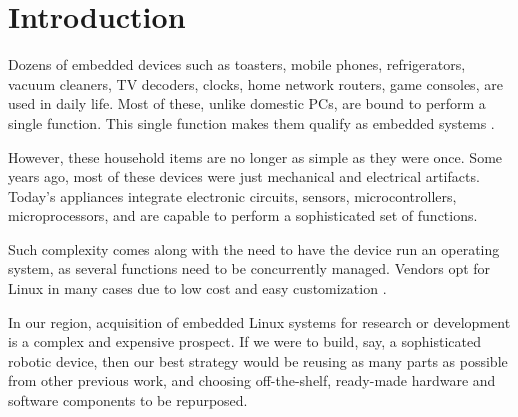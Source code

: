 \documentclass[conference]{IEEEtran}
\newcommand{\nota}[1]{}
\begin{document}
\section{Introduction}


\nota{
Existen decenas de dispositivos embebidos que utilizamos en la vida diaria.
Tostadoras, teléfonos móviles, heladeras, aspiradoras,
decodificadores de televisión, relojes, routers hogareños, consola de juegos, etc.
Y la mayoría de estos sistemas, a diferencia de una PC que puede
realizar miles de funciones diferentes, realizan una única función.
Esta única tarea define que nos encontramos ante sistemas embebidos \cite{steveheath}.
}
Dozens of embedded devices such as toasters, mobile phones, refrigerators, 
vacuum cleaners, TV decoders, clocks, home network routers, game consoles,  are used in daily life. Most of these, unlike domestic PCs, are bound to perform a single function. This single function makes them qualify as embedded systems \cite{steveheath}.


\nota{
Sin embargo, estos artículos del hogar ya no son tan simples como antes. Algunos
años atrás, la mayor parte de estos dispositivos fueron únicamente mecánicos
y eléctricos. En cambio, hoy en día, la mayoría incluye placas
de circuitos electrónicos, sensores, microcontroladores, microprocesadores y
funcionalidades sofisticadas.
}
However, these household items are no longer as simple as they were once. Some years ago,
most of these devices were just mechanical and electrical artifacts. Today's appliances
integrate electronic circuits, sensors, microcontrollers, microprocessors, 
and are capable to perform a sophisticated set of functions. 

\nota{
Esta complejidad trajo la necesidad de ejecutar un sistema operativo
dentro del dispositivo, ya
que se necesita administrar varias funcionalidades al mismo tiempo.
Actualmente, los fabricantes han optado por Linux en muchos
casos, debido principalmente a su
bajo costo y su gran adaptabilidad (referencia electrolux brasil, celular android, router linux)
}
Such complexity comes along with the need to have the device run an operating system, as several functions need to be concurrently managed. Vendors opt for Linux in many cases due to low cost and easy customization \cite{electrolux, android}.

\nota{En el marco regional, adquirir sistemas Linux embebidos para investigación
o desarrollo es complejo y costoso.
Si fuese necesario, por ejemplo, construir un sofisticado dispositivo robótico
en nuestra realidad, reutilizaríamos, dentro de lo posible, la mayor cantidad de partes de otros
trabajos previos, como así también componentes de hardware y software
preexistentes, que puedan adaptarse cuando y donde se necesite.
}
In our region, acquisition of embedded Linux systems for research or development is a complex and expensive prospect. If we were to build, say, a sophisticated robotic device, then our best strategy would be reusing as many parts as possible from other previous work, and choosing off-the-shelf, ready-made hardware and software components to be repurposed.
\end{document}
